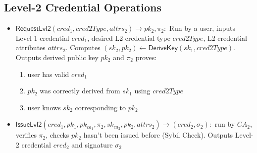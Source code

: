 \subsection{Level-2 Credential Operations}
\begin{itemize}
    \item $\mathsf{RequestLvl2}(cred_1, cred2Type, attrs_2) \to pk_2, \pi_{2}:$ Run by a user, inputs Level-1 credential $cred_1$, desired L2 credential type $cred2Type$, L2 credential attributes $attrs_2$. Computes $(sk_2, pk_2) \gets \mathsf{DeriveKey}(sk_1, cred2Type)$. Outputs derived public key $pk_2$ and $\pi_2$ proves:
    \begin{enumerate}
        \item user has valid $cred_1$
        \item $pk_2$ was correctly derived from $sk_1$ using $cred2Type$
        \item user knows $sk_2$ corresponding to $pk_2$
    \end{enumerate}

    \item $\mathsf{IssueLvl2}(cred_1, pk_1, pk_{ca_1}, \pi_2, sk_{ca_2}, pk_2, attrs_2) \to (cred_2, \sigma_2): $ run by $CA_2$, verifies $\pi_2$, checks $pk_2$ hasn't been issued before (Sybil Check). Outputs Level-2 credential $cred_2$ and signature $\sigma_2$
\end{itemize}



